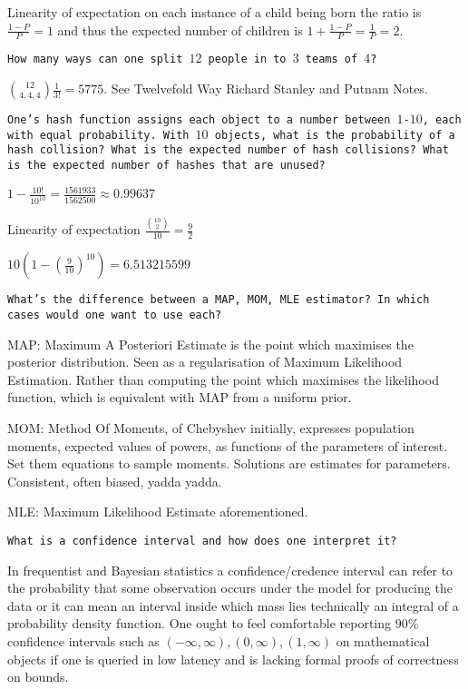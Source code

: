 Linearity of expectation on each instance of a child being born the ratio is $\frac{1-P}{P}=\boxed{1}$ and thus the expected number of children is $1+\frac{1-P}{P}=\frac{1}{P}=\boxed{2}$.

\texttt{How many ways can one split $12$ people in to $3$ teams of $4$?}

$ \binom{12}{4,4,4} \frac{1}{3!} = \boxed{5775}$. See Twelvefold Way Richard Stanley and Putnam Notes.

\texttt{One's hash function assigns each object to a number between $1$-$10$, each with equal probability. With $10$ objects, what is the probability of a hash collision? What is the expected number of hash collisions? What is the expected number of hashes that are unused?}

$1-\frac{10!}{10^{10}} = \boxed{\frac{1561933}{1562500}}\approx 0.99637$

Linearity of expectation $\frac{\binom{10}{2}}{10}=\boxed{\frac{9}{2}}$

$10\left(1-\left( \frac{9}{10} \right)^{10} \right)=\boxed{6.513215599}$

\texttt{What's the difference between a MAP, MOM, MLE estimator? In which cases would one want to use each?}

MAP: Maximum A Posteriori Estimate is the point which maximises the posterior distribution. Seen as a regularisation of Maximum Likelihood Estimation. Rather than computing the point which maximises the likelihood function, which is equivalent with MAP from a uniform prior.

MOM: Method Of Moments, of Chebyshev initially, expresses population moments, expected values of powers, as functions of the parameters of interest. Set them equations to sample moments. Solutions are estimates for parameters. Consistent, often biased, yadda yadda.

MLE: Maximum Likelihood Estimate aforementioned.

\texttt{What is a confidence interval and how does one interpret it?}

In frequentist and Bayesian statistics a confidence/credence interval can refer to the probability that some observation occurs under the model for producing the data or it can mean an interval inside which mass lies technically an integral of a probability density function. One ought to feel comfortable reporting $90\%$ confidence intervals such as $(-\infty, \infty), (0,\infty), (1,\infty)$ on mathematical objects if one is queried in low latency and is lacking formal proofs of correctness on bounds.


